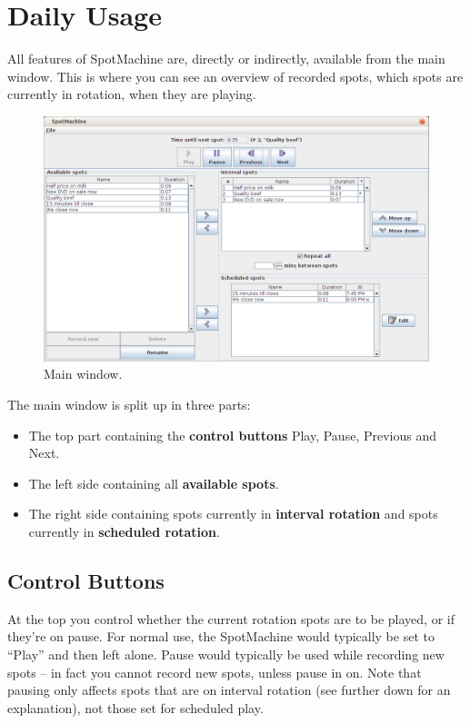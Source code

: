 \documentclass[a4paper,12pt]{report}
\begin{document}
\chapter{Daily Usage}
All features of SpotMachine are, directly or indirectly, available from the main window. This is where you can see an overview of recorded spots, which spots are currently in rotation, when they are playing.

\begin{figure}[h]
\centering \includegraphics[width=130mm]{mainwindow.png}
\caption{Main window.}
\end{figure}

The main window is split up in three parts:
\begin{itemize}
\item The top part containing the {\bf control buttons} Play, Pause, Previous and Next.
\item The left side containing all {\bf available spots}.
\item The right side containing spots currently in {\bf interval rotation} and spots currently in {\bf scheduled rotation}.
\end{itemize}

\section{Control Buttons}
At the top you control whether the current rotation spots are to be played, or if they're on pause. For normal use, the SpotMachine would typically be set to ``Play'' and then left alone. Pause would typically be used while recording new spots -- in fact you cannot record new spots, unless pause in on. Note that pausing only affects spots that are on interval rotation (see further down for an explanation), not those set for scheduled play. %
\end{document}
